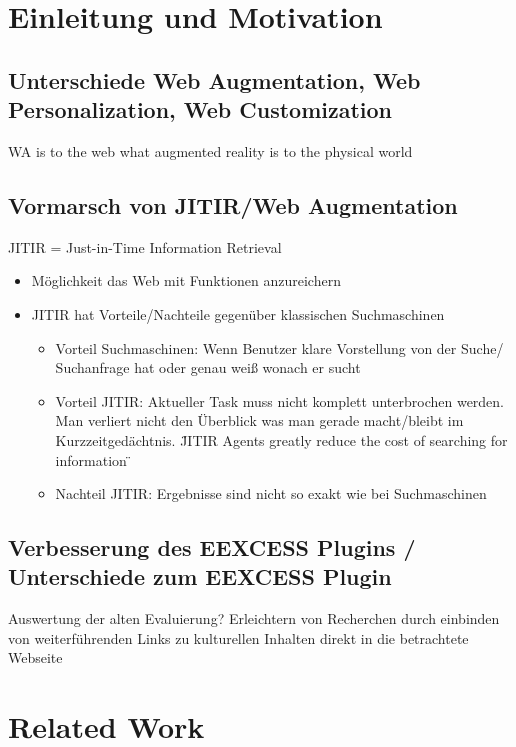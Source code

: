 \section{Einleitung und Motivation}
\subsection{Unterschiede Web Augmentation, Web Personalization, Web Customization}
WA is to the web what augmented reality is to the physical world

\subsection{Vormarsch von JITIR/Web Augmentation}
JITIR = Just-in-Time Information Retrieval
\begin{itemize}
	\item Möglichkeit das Web mit Funktionen anzureichern
	\item JITIR hat Vorteile/Nachteile gegenüber klassischen Suchmaschinen
		\begin{itemize}
			\item Vorteil Suchmaschinen: Wenn Benutzer klare Vorstellung von der Suche/ Suchanfrage hat oder genau weiß wonach er sucht
			\item Vorteil JITIR: Aktueller Task muss nicht komplett unterbrochen werden. Man verliert nicht den Überblick was man gerade macht/bleibt im Kurzzeitgedächtnis. \"JITIR Agents greatly reduce the cost of searching for information \"
			\item Nachteil JITIR: Ergebnisse sind nicht so exakt wie bei Suchmaschinen
		\end{itemize}
\end{itemize}

\subsection{Verbesserung des EEXCESS Plugins / Unterschiede zum EEXCESS Plugin}
Auswertung der alten Evaluierung?
Erleichtern von Recherchen durch einbinden von weiterführenden Links zu kulturellen Inhalten direkt in die betrachtete Webseite

\section{Related Work}
